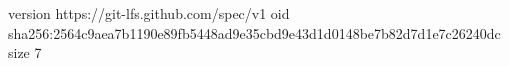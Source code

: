 version https://git-lfs.github.com/spec/v1
oid sha256:2564c9aea7b1190e89fb5448ad9e35cbd9e43d1d0148be7b82d7d1e7c26240dc
size 7
